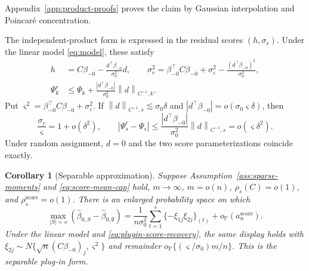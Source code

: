 \documentclass[a4paper,11pt,english]{article}
\newtheorem{corollary}[theorem]{Corollary}
\newcommand{\Prob}{\mathbb P}
\newcommand{\norm}[1]{\left\lVert #1\right\rVert}
\begin{document}
Appendix~\ref{app:product-proofs} proves the claim by Gaussian
interpolation and Poincar\'e concentration.

The independent-product form is expressed in the residual scores
$(h,\sigma_r)$.  Under the linear model \eqref{eq:model}, these satisfy
\begin{equation}\label{eq:score-translation}
\begin{split}
        h&=C\beta_{-0}
        -\frac{d^\top\beta_{-0}}{\sigma_0^2}d,
        \qquad
        \sigma_r^2
        =\beta_{-0}^\top C\beta_{-0}+\sigma_\varepsilon^2
        -\frac{(d^\top\beta_{-0})^2}{\sigma_0^2},\\
        \Psi_k^r
        &\le \Psi_k
        +\frac{|d^\top\beta_{-0}|}{\sigma_0^2}
        \norm{d}_{C^{-1},k}.
\end{split}
\end{equation}
Put
$\varsigma^2=\beta_{-0}^\top C\beta_{-0}+\sigma_\varepsilon^2$.
If $\norm{d}_{C^{-1},s}\lesssim\sigma_0\delta$ and
$|d^\top\beta_{-0}|=o(\sigma_0\varsigma\delta)$, then
\begin{equation}\label{eq:plugin-score-recovery}
 \frac{\sigma_r}{\varsigma}=1+o(\delta^2),
 \qquad
 |\Psi_s^r-\Psi_s|
 \le \frac{|d^\top\beta_{-0}|}{\sigma_0^2}
 \norm{d}_{C^{-1},s}
 =o(\varsigma\delta^2).
\end{equation}
Under random assignment, $d=0$ and the two score parameterizations
coincide exactly.

\begin{corollary}[Separable approximation]
\label{cor:separable-approximation}
Suppose Assumption~\ref{ass:sparse-moments} and
\eqref{eq:score-mean-cap} hold,
$m\to\infty$, $m=o(n)$,
$\rho_s(C)=o(1)$, and $\rho_s^{\mathrm{score}}=o(1)$.
There is an enlarged probability space on which
\begin{equation}\label{eq:independent-top-s}
        \max_{|S|=s}(\hat\beta_{0,S}-\hat\beta_{0,\emptyset})
        =\frac1{n\sigma_0^2}
        \sum_{t=1}^s\{-\xi_{1j}\xi_{2j}\}_{(t)}
        +o_{\Prob}(a_n^{\mathrm{score}}).
\end{equation}
Under the linear model and \eqref{eq:plugin-score-recovery}, the same
display holds with
$\xi_{2j}\sim N\{\sqrt n(C\beta_{-0})_j,\varsigma^2\}$ and remainder
$o_{\Prob}\{(\varsigma/\sigma_0)m/n\}$.  This is the separable plug-in
form.
\end{corollary}
\end{document}
